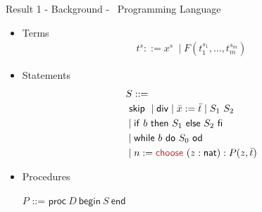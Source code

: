 
\begin{frame}{Result 1 - Background - \WhileCC\ Programming Language}
    \pause
    \footnotesize
    \begin{minipage}[t]{0.33\linewidth}
        \vspace{-1.8em}
       \center
        \textbf{\color{Blue}{Syntax}
        }
         \begin{itemize}
                \pause \item Terms
                \vspace{-0.5em}
                        \begin{align*}
                         t^s ::= x^s\ \mid F(t_1^{s_1}, \ldots , t_m^{s_m})
                        \end{align*}
                \vspace{-2.7em}
                \pause \item Statements
                \vspace{-0.5em}
                    \begin{align*}
                        &S ::=\\
                                &\ \mathsf{skip}\
                                \mid \mathsf{div}
                                \mid \bar{x} := \bar{t}
                                \mid S_1\ S_2\\
                                &\mid \mathsf{if}\ b \ \mathsf{then}\ S_1 \ \mathsf{else}\ S_2\ \mathsf{fi}\ \\
                                &\mid \mathsf{while}\ b\ \mathsf{do}\ S_0\ \mathsf{od}
                                \\
                                &\mid n:= \textcolor{BrickRed}{\mathsf{choose\ }} (z: \nat): P(z,\bar{t})
                    \end{align*}
                \vspace{-1.7em}
                \pause \item Procedures
                    \begin{center}
                        $P$ ::= $\mathsf{proc} \ D\ \mathsf{begin}\ S\ \mathsf{end}$
                    \end{center}
                        

\end{itemize}
\end{minipage}
\end{frame}
